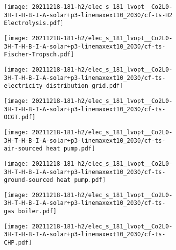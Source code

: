 \begin{figure}
    \begin{subfigure}{0.49\textwidth}
        \centering
        \texttt{[image: 20211218-181-h2/elec\_s\_181\_lvopt\_\_Co2L0-3H-T-H-B-I-A-solar+p3-linemaxext10\_2030/cf-ts-H2 Electrolysis.pdf]}
    \end{subfigure}
    \begin{subfigure}{0.49\textwidth}
        \centering
        \texttt{[image: 20211218-181-h2/elec\_s\_181\_lvopt\_\_Co2L0-3H-T-H-B-I-A-solar+p3-linemaxext10\_2030/cf-ts-Fischer-Tropsch.pdf]}
    \end{subfigure}
    \begin{subfigure}{0.49\textwidth}
        \centering
        \texttt{[image: 20211218-181-h2/elec\_s\_181\_lvopt\_\_Co2L0-3H-T-H-B-I-A-solar+p3-linemaxext10\_2030/cf-ts-electricity distribution grid.pdf]}
    \end{subfigure}
    \begin{subfigure}{0.49\textwidth}
        \centering
        \texttt{[image: 20211218-181-h2/elec\_s\_181\_lvopt\_\_Co2L0-3H-T-H-B-I-A-solar+p3-linemaxext10\_2030/cf-ts-OCGT.pdf]}
    \end{subfigure}
    \begin{subfigure}{0.49\textwidth}
        \centering
        \texttt{[image: 20211218-181-h2/elec\_s\_181\_lvopt\_\_Co2L0-3H-T-H-B-I-A-solar+p3-linemaxext10\_2030/cf-ts-air-sourced heat pump.pdf]}
    \end{subfigure}
    \begin{subfigure}{0.49\textwidth}
        \centering
        \texttt{[image: 20211218-181-h2/elec\_s\_181\_lvopt\_\_Co2L0-3H-T-H-B-I-A-solar+p3-linemaxext10\_2030/cf-ts-ground-sourced heat pump.pdf]}
    \end{subfigure}
    \begin{subfigure}{0.49\textwidth}
        \centering
        \texttt{[image: 20211218-181-h2/elec\_s\_181\_lvopt\_\_Co2L0-3H-T-H-B-I-A-solar+p3-linemaxext10\_2030/cf-ts-gas boiler.pdf]}
    \end{subfigure}
    \begin{subfigure}{0.49\textwidth}
        \centering
        \texttt{[image: 20211218-181-h2/elec\_s\_181\_lvopt\_\_Co2L0-3H-T-H-B-I-A-solar+p3-linemaxext10\_2030/cf-ts-CHP.pdf]}
    \end{subfigure}
    \begin{subfigure}{0.49\textwidth}
        \centering

\end{subfigure}
\end{figure}
